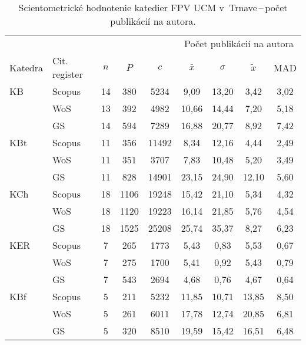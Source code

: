 \begin{table}
\centering\small
  \caption[Hodnotenie FPV\,--\,počet publikácií na autora]{Scientometrické hodnotenie katedier FPV UCM v~Trnave\,--\,počet publikácií na autora.}
  \label{tab:1-staff.results}
\begin{tabularx}{\textwidth}{lXc@{\hspace{2.5em}}c@{\hspace{2.5em}}c@{\hspace{3.5em}}cccc}
  \toprule\noalign{\vspace{.3ex}}
         &        &   &     &      & \multicolumn{4}{c}{Počet publikácií na autora}  \\
 Katedra & Cit. register  & $n$   & $P$     &  $c$     & $\bar{x}$      & $\sigma$  & $\tilde{x}$   & MAD  \\[0.3ex]
\midrule\noalign{\vspace{.5ex}}
 KB   & Scopus & 14 & 380  & 5234  & 9,09          & 13,20 & 3,42  & 3,02 \\
      & WoS    & 13 & 392  & 4982  & 10,66         & 14,44 & 7,20  & 5,18 \\
      & GS     & 14 & 594  & 7289  & 16,88         & 20,77 & 8,92  & 7,42 \\[3ex]
 KBt  & Scopus & 11 & 356  & 11492 & 8,34          & 12,16 & 4,44  & 2,49 \\
      & WoS    & 11 & 351  & 3707  & 7,83          & 10,48 & 5,20  & 3,49 \\
      & GS     & 11 & 828  & 14901 & 23,15         & 24,90 & 12,10 & 5,60 \\[3ex]
 KCh  & Scopus & 18 & 1106 & 19248 & 15,42         & 21,10 & 5,34  & 4,32 \\
      & WoS    & 18 & 1120 & 19223 & 16,14         & 21,85 & 5,76  & 4,54 \\
      & GS     & 18 & 1525 & 25208 & 25,74         & 35,37 & 8,27  & 6,23 \\[3ex]
 KER  & Scopus & 7  & 265  & 1773  & 5,43          & 0,83  & 5,53  & 0,67 \\
      & WoS    & 7  & 275  & 1700  & 5,41          & 0,92  & 5,43  & 0,79 \\
      & GS     & 7  & 543  & 2694  & 4,68          & 0,76  & 4,67  & 0,64 \\[3ex]
 KBf  & Scopus & 5  & 211  & 5232  & 11,85         & 10,71 & 13,85 & 8,50 \\
      & WoS    & 5  & 261  & 6011  & 17,78         & 12,74 & 20,85 & 6,81 \\
      & GS     & 5  & 320  & 8510  & 19,59         & 15,42 & 16,51 & 6,48 \\[3ex]

\end{tabularx}
\end{table}
